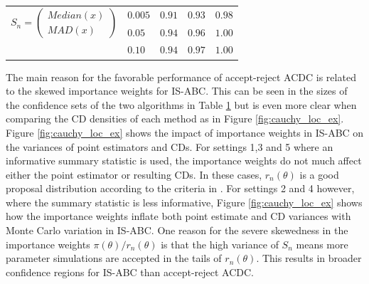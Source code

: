 \begin{table}
{\begin{tabular}{lllll}
\multirow{2}{*}{$S_n = \begin{pmatrix}Median(x) \\ MAD(x)\end{pmatrix}$} & $0.005$             & $0.91$             & $0.93$         & $0.98$               \\
                                                                         & $0.05$              & $0.94$             & $0.96$        & $1.00$                \\
                                                                         & $0.10$              & $0.94$             & $0.97$        & $1.00$                \\     
\end{tabular}\label{EX1_results}}
\end{table}

The main reason for the favorable performance of accept-reject ACDC 
is related to the skewed importance weights for IS-ABC. This can be seen in the sizes of the confidence sets of the two algorithms in Table \ref{EX1_results} but is even more clear when comparing the CD densities of each method as in Figure \ref{fig:cauchy_loc_ex}. Figure \ref{fig:cauchy_loc_ex} shows the impact of importance weights in IS-ABC %
on the variances of point estimators and CDs. %
For settings 1,3 and 5 where an informative summary statistic is used, the importance weights do not much affect either the point estimator or resulting CDs. In these cases, $r_n(\theta)$ is a good proposal distribution according to the criteria in \cite{Li2016}. For settings 2 and 4 however, where the summary statistic is less informative, Figure \ref{fig:cauchy_loc_ex} shows how the importance weights inflate both point estimate and CD variances with Monte Carlo variation in IS-ABC. One reason for the severe skewedness in the importance weights $\pi(\theta)/r_n(\theta)$ is that the high variance of $S_n$ means more parameter simulations are accepted in the tails of $r_n(\theta)$. This results in broader confidence regions for IS-ABC than accept-reject ACDC.

